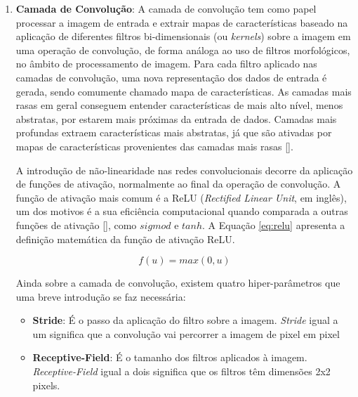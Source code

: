 \begin{enumerate}
    \item \textbf{Camada de Convolução}:
            A camada de convolução tem como papel processar a imagem de entrada e extrair mapas de características baseado na aplicação 
            de diferentes filtros bi-dimensionais (ou \textit{kernels}) sobre a imagem em uma operação de convolução, de forma análoga ao 
            uso de filtros morfológicos, no âmbito de processamento de imagem. Para cada filtro aplicado nas camadas de convolução, uma nova 
            representação dos dados de entrada é gerada, sendo comumente chamado mapa de características. As camadas mais rasas em geral 
            conseguem entender características de mais alto nível, menos abstratas, por estarem mais próximas da entrada de dados. Camadas mais 
            profundas extraem características mais abstratas, já que são ativadas por mapas de características provenientes das camadas mais 
            rasas [].
        
            A introdução de não-linearidade nas redes convolucionais decorre da aplicação de funções de ativação, normalmente ao final da 
            operação de convolução. A função de ativação mais comum é a ReLU (\textit{Rectified Linear Unit}, em inglês), um dos motivos é a 
            sua eficiência computacional quando comparada a outras funções de ativação [], como $sigmod$ e $tanh$. 
            A Equação \ref{eq:relu} apresenta a definição matemática da função de ativação ReLU.
            
            \begin{equation}
                f(u) = max(0,u)
                \label{eq:relu}
            \end{equation}
            
            Ainda sobre a camada de convolução, existem quatro hiper-parâmetros que uma breve introdução se faz necessária:
            \begin{itemize}
                \item \textbf{Stride}: É o passo da aplicação do filtro sobre a imagem. \textit{Stride} igual a um significa que a convolução 
                vai percorrer a imagem de pixel em pixel

                \item \textbf{Receptive-Field}: É o tamanho dos filtros aplicados à imagem. \textit{Receptive-Field} igual a dois significa 
                que os filtros têm dimensões 2x2 pixels.


\end{itemize}
\end{enumerate}

